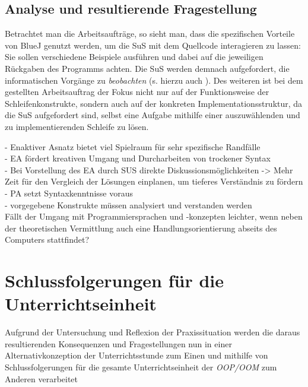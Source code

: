 \documentclass[paper=a4, DIV=13, BCOR=12mm, twoside=on, onecolumn=on, open = any, titlepage =on, parskip =half-, headsepline = on, footsepline = on, chapterprefix = on, sectionprefix = on, appendixprefix = off, fontsize = 11pt, numbers = noenddot, abstract = off]{scrreprt}
\begin{document}
 \section{Analyse und resultierende Fragestellung}
\onehalfspacing

Betrachtet man die Arbeitsaufträge, so sieht man, dass die spezifischen Vorteile von BlueJ genutzt werden, um die SuS mit dem Quellcode interagieren zu lassen: Sie sollen verschiedene Beispiele ausführen und dabei auf die jeweiligen Rückgaben des Programms achten. Die SuS werden demnach aufgefordert, die informatischen Vorgänge zu \emph{beobachten} (s. hierzu auch \cite[S.67ff.]{aebli:11}). Des weiteren ist bei dem gestellten Arbeitsauftrag der Fokus nicht nur auf der Funktionsweise der Schleifenkonstrukte, sondern auch auf der konkreten Implementationsstruktur, da die SuS aufgefordert sind, selbst eine Aufgabe mithilfe einer auszuwählenden und zu implementierenden Schleife zu lösen. 

- Enaktiver Asnatz bietet viel Spielraum für sehr spezifische Randfälle\\
- EA fördert kreativen Umgang und Durcharbeiten von trockener Syntax\\
- Bei Vorstellung des EA durch SUS direkte Diskussionsmöglichkeiten -> Mehr Zeit für den Vergleich der Lösungen einplanen, um tieferes Verständnis zu fördern\\
- PA setzt Syntaxkenntnisse voraus\\
- vorgegebene Konstrukte müssen analysiert und verstanden werden\\

Fällt der Umgang mit Programmiersprachen und -konzepten leichter, wenn neben der theoretischen Vermittlung auch eine Handlungsorientierung abseits des Computers stattfindet?

\par \singlespacing
\chapter{Schlussfolgerungen für die Unterrichtseinheit}
\onehalfspacing

Aufgrund der Untersuchung und Reflexion der Praxissituation werden die daraus resultierenden Konsequenzen und Fragestellungen nun in einer Alternativkonzeption der Unterrichtsstunde zum Einen und mithilfe von Schlussfolgerungen für die gesamte Unterrichtseinheit der \emph{OOP/OOM} zum Anderen verarbeitet 
\end{document}
